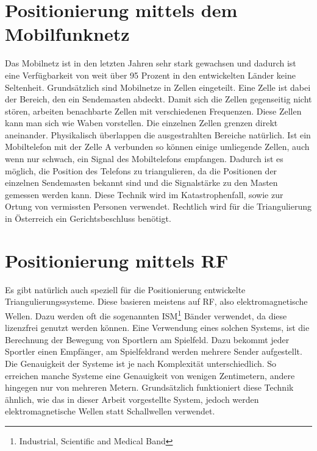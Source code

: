 \section{Positionierung mittels dem Mobilfunknetz}
Das Mobilnetz ist in den letzten Jahren sehr stark gewachsen und dadurch ist eine Verfügbarkeit von weit über 95 Prozent in den entwickelten Länder keine Seltenheit. Grundsätzlich sind Mobilnetze in Zellen eingeteilt. Eine Zelle ist dabei der Bereich, den ein Sendemasten abdeckt. Damit sich die Zellen gegenseitig nicht stören, arbeiten benachbarte Zellen mit verschiedenen Frequenzen. Diese Zellen kann man sich wie Waben vorstellen. Die einzelnen Zellen grenzen direkt aneinander. Physikalisch überlappen die ausgestrahlten Bereiche natürlich.
Ist ein Mobiltelefon mit der Zelle A verbunden so können einige umliegende Zellen, auch wenn nur schwach, ein Signal des Mobiltelefons empfangen. Dadurch ist es möglich, die Position des Telefons zu triangulieren, da die Positionen der einzelnen Sendemasten bekannt sind und die Signalstärke zu den Masten gemessen werden kann. Diese Technik wird im Katastrophenfall, sowie zur Ortung von vermissten Personen verwendet. Rechtlich wird für die Triangulierung in Österreich ein Gerichtsbeschluss benötigt.

\section{Positionierung mittels RF}
Es gibt natürlich auch speziell für die Positionierung entwickelte Triangulierungssysteme. Diese basieren meistens auf RF, also elektromagnetische Wellen. Dazu werden oft die sogenannten ISM\footnote{Industrial, Scientific and Medical Band} Bänder verwendet, da diese lizenzfrei genutzt werden können. Eine Verwendung eines solchen Systems, ist die Berechnung der Bewegung von Sportlern am Spielfeld. Dazu bekommt jeder Sportler einen Empfänger, am Spielfeldrand werden mehrere Sender aufgestellt. Die Genauigkeit der Systeme ist je nach Komplexität unterschiedlich. So erreichen manche Systeme eine Genauigkeit von wenigen Zentimetern, andere hingegen nur von mehreren Metern. Grundsätzlich funktioniert diese Technik ähnlich, wie das in dieser Arbeit vorgestellte System, jedoch werden elektromagnetische Wellen statt Schallwellen verwendet.



